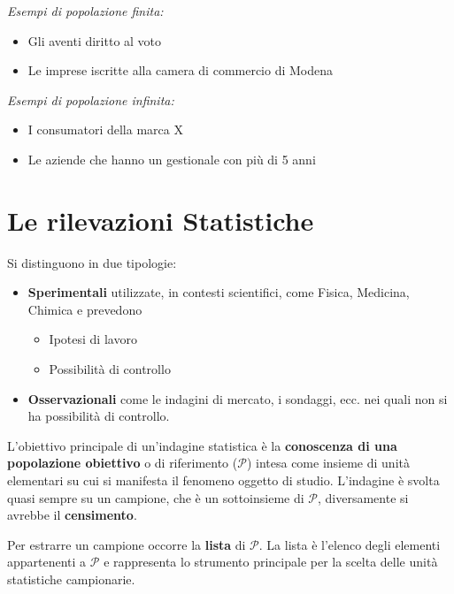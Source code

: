 \documentclass[
  11pt,
]{book}
\providecommand{\tightlist}{%
  \setlength{\itemsep}{0pt}\setlength{\parskip}{0pt}}
\theoremstyle{mytheoremstyle}
\theoremstyle{mydefstyle}
\begin{document}
\emph{Esempi di popolazione finita:}

\begin{itemize}
\tightlist
\item
  Gli aventi diritto al voto
\item
  Le imprese iscritte alla camera di commercio di Modena
\end{itemize}

\emph{Esempi di popolazione infinita:}

\begin{itemize}
\tightlist
\item
  I consumatori della marca X
\item
  Le aziende che hanno un gestionale con più di 5 anni
\end{itemize}

\section{Le rilevazioni Statistiche}\label{riv}

Si distinguono in due tipologie:

\begin{itemize}
\tightlist
\item
  \textbf{Sperimentali} utilizzate, in contesti scientifici, come Fisica, Medicina, Chimica e prevedono

  \begin{itemize}
  \tightlist
  \item
    Ipotesi di lavoro
  \item
    Possibilità di controllo
  \end{itemize}
\item
  \textbf{Osservazionali} come le indagini di mercato, i sondaggi, ecc.
  nei quali non si ha possibilità di controllo.
\end{itemize}

L'obiettivo principale di un'indagine statistica è la \textbf{conoscenza di una popolazione obiettivo} o di riferimento (\(\mathscr{P}\)) intesa come insieme di unità elementari su cui si manifesta il fenomeno oggetto di studio.
L'indagine è svolta quasi sempre su un campione, che è un sottoinsieme di \(\mathscr{P}\), diversamente si avrebbe il \textbf{censimento}.

Per estrarre un campione occorre la \textbf{lista} di \(\mathscr{P}\).
La lista è l'elenco degli elementi appartenenti a \(\mathscr{P}\) e rappresenta lo strumento principale per la scelta delle unità statistiche campionarie.
\end{document}
